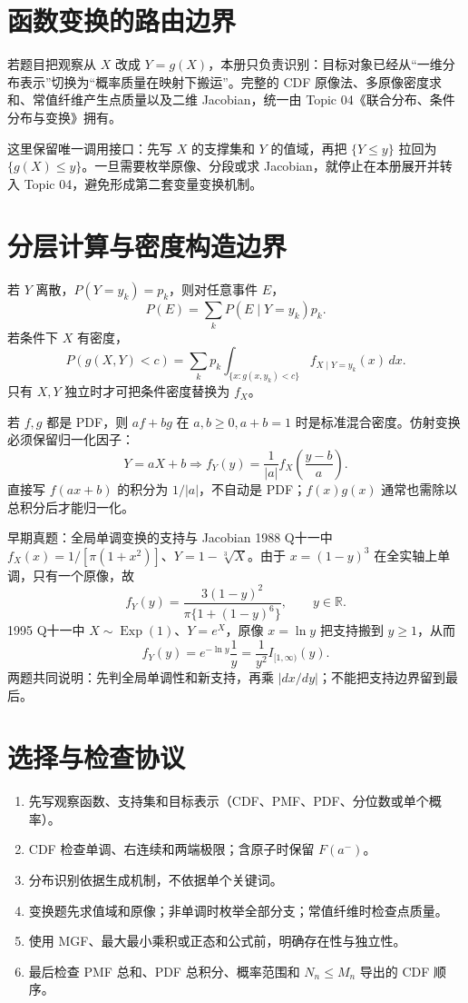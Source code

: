 \documentclass[11pt,a4paper]{ctexart}
\begin{document}
\section{函数变换的路由边界}

若题目把观察从 $X$ 改成 $Y=g(X)$，本册只负责识别：目标对象已经从“一维分布表示”切换为“概率质量在映射下搬运”。完整的 CDF 原像法、多原像密度求和、常值纤维产生点质量以及二维 Jacobian，统一由 Topic 04《联合分布、条件分布与变换》拥有。

这里保留唯一调用接口：先写 $X$ 的支撑集和 $Y$ 的值域，再把 $\{Y\le y\}$ 拉回为 $\{g(X)\le y\}$。一旦需要枚举原像、分段或求 Jacobian，就停止在本册展开并转入 Topic 04，避免形成第二套变量变换机制。

\section{分层计算与密度构造边界}

若 $Y$ 离散，$P(Y=y_k)=p_k$，则对任意事件 $E$，
\[
P(E)=\sum_kP(E\mid Y=y_k)p_k.
\]
若条件下 $X$ 有密度，
\[
P(g(X,Y)<c)=\sum_kp_k\int_{\{x:g(x,y_k)<c\}}f_{X\mid Y=y_k}(x)\,dx.
\]
只有 $X,Y$ 独立时才可把条件密度替换为 $f_X$。

若 $f,g$ 都是 PDF，则 $af+bg$ 在 $a,b\ge0,a+b=1$ 时是标准混合密度。仿射变换必须保留归一化因子：
\[
Y=aX+b\Longrightarrow f_Y(y)=\frac1{|a|}f_X\left(\frac{y-b}{a}\right).
\]
直接写 $f(ax+b)$ 的积分为 $1/|a|$，不自动是 PDF；$f(x)g(x)$ 通常也需除以总积分后才能归一化。

\begin{examplebox}{早期真题：全局单调变换的支持与 Jacobian}
1988 Q十一中 $f_X(x)=1/[\pi(1+x^2)]$、$Y=1-\sqrt[3]{X}$。由于 $x=(1-y)^3$ 在全实轴上单调，只有一个原像，故
\[
f_Y(y)=\frac{3(1-y)^2}{\pi\{1+(1-y)^6\}},\qquad y\in\mathbb R.
\]
1995 Q十一中 $X\sim\operatorname{Exp}(1)$、$Y=e^X$，原像 $x=\ln y$ 把支持搬到 $y\ge1$，从而
\[
f_Y(y)=e^{-\ln y}\frac1y=\frac1{y^2}I_{[1,\infty)}(y).
\]
两题共同说明：先判全局单调性和新支持，再乘 $|dx/dy|$；不能把支持边界留到最后。
\end{examplebox}

\section{选择与检查协议}
\begin{enumerate}
\item 先写观察函数、支持集和目标表示（CDF、PMF、PDF、分位数或单个概率）。
\item CDF 检查单调、右连续和两端极限；含原子时保留 $F(a^-)$。
\item 分布识别依据生成机制，不依据单个关键词。
\item 变换题先求值域和原像；非单调时枚举全部分支；常值纤维时检查点质量。
\item 使用 MGF、最大最小乘积或正态和公式前，明确存在性与独立性。
\item 最后检查 PMF 总和、PDF 总积分、概率范围和 $N_n\le M_n$ 导出的 CDF 顺序。
\end{enumerate}
\end{document}
